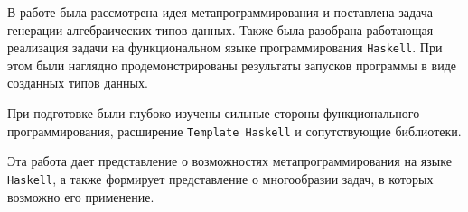\Conc

В работе была рассмотрена идея метапрограммирования и поставлена задача генерации алгебраических типов данных. Также была разобрана работающая реализация задачи на функциональном языке программирования \lstinline{Haskell}. При этом были наглядно продемонстрированы результаты запусков программы в виде созданных типов данных.

При подготовке были глубоко изучены сильные стороны функционального программирования, расширение \lstinline{Template Haskell} и сопутствующие библиотеки.

Эта работа дает представление о возможностях метапрограммирования на языке \lstinline{Haskell}, а также формирует представление о многообразии задач, в которых возможно его применение.	

\printbibliography[%
    heading=bibintoc%
]


